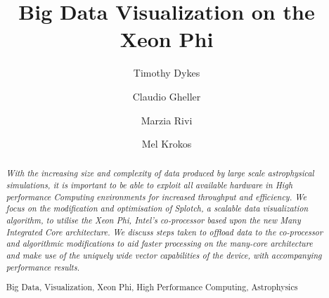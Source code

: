 \documentclass[runningheads,a4paper]{llncs}
\newcommand{\keywords}[1]{\par\addvspace\baselineskip
\noindent\keywordname\enspace\ignorespaces#1}
\begin{document}
\mainmatter  %

\title{Big Data Visualization on the Xeon Phi}


%
%
\author{Timothy Dykes
\and Claudio Gheller
\and Marzia Rivi
\and Mel Krokos
}
%

\institute{   
   University of Portsmouth,
   Portsmouth, U.K.\\
\mailsa\\
\and
  CSCS-ETHZ,
  Lugano, Switzerland\\
  \email{cgheller@cscs.ch}
\and
   University of Oxford,
   Oxford, U.K.\\
   \email{rivi@physics.ox.ac.uk}\\
}
%
%

\maketitle


\begin{abstract}
\emph{With the increasing size and complexity of data produced by large scale astrophysical simulations, 
it is important to be able to exploit all available hardware in High performance Computing environments 
for increased throughput and efficiency. We focus on the modification and optimisation of Splotch, a 
scalable data visualization algorithm, to utilise the Xeon Phi, Intel's co-processor based upon the new 
Many Integrated Core architecture. We discuss steps taken to offload data to the co-processor and 
algorithmic modifications to aid faster processing on the many-core architecture and make use of the 
uniquely wide vector capabilities of the device, with accompanying performance results.}

\keywords Big Data, Visualization, Xeon Phi, High Performance Computing, Astrophysics
\end{abstract}
\end{document}
